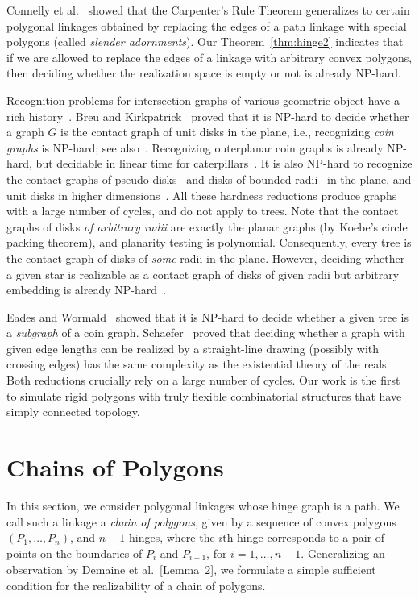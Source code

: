 \documentclass{article}
\theoremstyle{plain}%
\begin{document}
Connelly et al.~\cite{CDD+10} showed that the Carpenter's Rule Theorem generalizes to certain polygonal linkages obtained by replacing the edges of a path linkage with special polygons (called \emph{slender adornments}). Our Theorem~\ref{thm:hinge2} indicates that if we are allowed to replace the edges of a linkage with arbitrary convex polygons, then deciding whether the realization space is empty or not is already NP-hard.

Recognition problems for intersection graphs of various geometric object have a rich history~\cite{HK01}. Breu and Kirkpatrick~\cite{BK98} proved that it is NP-hard to decide whether a graph $G$ is the contact graph of unit disks in the plane, i.e., recognizing \emph{coin graphs} is NP-hard; see also~\cite{BET+99}. Recognizing outerplanar coin graphs is already NP-hard, but decidable in linear time for caterpillars~\cite{KNR15}. It is also NP-hard to recognize the contact graphs of pseudo-disks~\cite{HK01} and disks of bounded radii~\cite{BK95} in the plane, and unit disks in higher dimensions~\cite{Hli97,HK01}. All these hardness reductions produce graphs with a large number of cycles, and do not apply to trees. Note that the contact graphs of disks \emph{of arbitrary radii} are exactly the planar graphs (by Koebe's circle packing theorem), and planarity testing is polynomial. Consequently, every tree is the contact graph of disks of \emph{some} radii in the plane.
However, deciding whether a given star is realizable as a contact graph of disks of given radii but arbitrary embedding is already NP-hard~\cite{KNR15}.

Eades and Wormald~\cite{EW90} showed that it is NP-hard to decide whether a given tree is a \emph{subgraph} of a coin graph. Schaefer~\cite{Sch13} proved that deciding whether a graph with given edge lengths can be realized by a straight-line drawing (possibly with crossing edges) has the same complexity as the existential theory of the reals. Both reductions crucially rely on a large number of cycles. Our work is the first to simulate rigid polygons with truly flexible combinatorial structures that have simply connected topology.

\section{Chains of Polygons\label{sec:path}}

In this section, we consider polygonal linkages whose hinge graph is a path. We call such a linkage a \emph{chain of polygons}, given by a sequence of convex polygons $(P_1,\ldots, P_n)$, and $n-1$ hinges, where the $i$th hinge corresponds to a pair of points on the boundaries of $P_i$ and $P_{i+1}$, for $i=1,\ldots, n-1$.
Generalizing an observation by Demaine et al.~\cite{DEEH02}[Lemma~2], we formulate a simple sufficient condition for the realizability of a chain of polygons.
\end{document}
